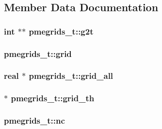 \subsection{\-Member \-Data \-Documentation}
\hypertarget{structpmegrids__t_a7df80da9ed0a70730f8aab0041d455e8}{
\subsubsection[{g2t}]{\setlength{\rightskip}{0pt plus 5cm}int $\ast$$\ast$ {\bf pmegrids\-\_\-t\-::g2t}}}\label{structpmegrids__t_a7df80da9ed0a70730f8aab0041d455e8}
\hypertarget{structpmegrids__t_ae512f10c3ea4a3dd76b573f6299e1703}{
\subsubsection[{grid}]{ {\bf pmegrids\-\_\-t\-::grid}}}\label{structpmegrids__t_ae512f10c3ea4a3dd76b573f6299e1703}
\hypertarget{structpmegrids__t_a7f16053002ed6d7fe5fb65415520efd7}{
\subsubsection[{grid\-\_\-all}]{\setlength{\rightskip}{0pt plus 5cm}real $\ast$ {\bf pmegrids\-\_\-t\-::grid\-\_\-all}}}\label{structpmegrids__t_a7f16053002ed6d7fe5fb65415520efd7}
\hypertarget{structpmegrids__t_a1d7f8bb7c2805ef018ccdf3c211137ed}{
\subsubsection[{grid\-\_\-th}]{ $\ast$ {\bf pmegrids\-\_\-t\-::grid\-\_\-th}}}\label{structpmegrids__t_a1d7f8bb7c2805ef018ccdf3c211137ed}
\hypertarget{structpmegrids__t_a3b0b3933a569b652104c973f24a1e979}{
\subsubsection[{nc}]{ {\bf pmegrids\-\_\-t\-::nc}}}\label{structpmegrids__t_a3b0b3933a569b652104c973f24a1e979}
